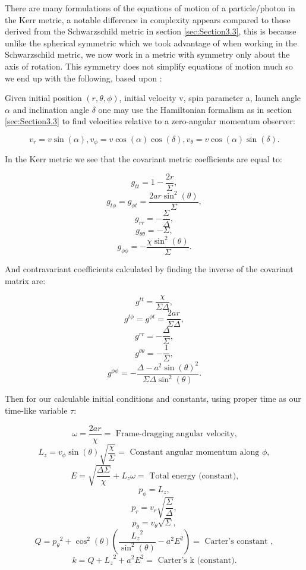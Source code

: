 \documentclass[oneside,openright,frontopenright, singlespacing]{dmathesis}
\begin{document}
	There are many formulations of the equations of motion of a particle/photon in the Kerr metric, a notable difference in complexity appears compared to those derived from the Schwarzschild metric in section \ref{sec:Section3.3}, this is because unlike the spherical symmetric which we took advantage of when working in the Schwarzschild metric, we now work in a metric with symmetry only about the axis of rotation. This symmetry does not simplify equations of motion much so we end up with the following, based upon \cite{yukterezKerr}:

\vspace{1em}
	Given initial position $(r, \theta, \phi)$, initial velocity v, spin parameter a, launch angle $\alpha$ and inclination angle $\delta$ one may use the Hamiltonian formalism as in section \ref{sec:Section3.3} to find velocities relative to a zero-angular momentum observer:
	
	\[v_r = v\sin(\alpha), v_\phi = v\cos(\alpha)\cos(\delta), v_\theta = v\cos(\alpha)\sin(\delta).\]

\vspace{1em}
	In the Kerr metric we see that the covariant metric coefficients are equal to:

	\[g_{tt} = 1-\frac{2r}{\Sigma},\]
	\[g_{t\phi} = g_{{\phi}t} = \frac{2ar\sin^2(\theta)}{\Sigma},\]
	\[g_{rr} = -\frac{\Sigma}{\Delta},\]
	\[g_{\theta\theta} = -\Sigma,\]
	\[g_{\phi\phi} = -\frac{\chi\sin^2(\theta)}{\Sigma}.\]

	And contravariant coefficients calculated by finding the inverse of the covariant matrix are:

	\[g^{tt} = \frac{\chi}{\Sigma\Delta},\]
	\[g^{t\phi} = g^{{\phi}t} = \frac{2ar}{\Sigma\Delta},\]
	\[g^{rr} = -\frac{\Delta}{\Sigma},\]
	\[g^{\theta\theta} = -\frac{1}{\Sigma},\]
	\[g^{\phi\phi} = -\frac{\Delta-a^2\sin(\theta)^2}{\Sigma\Delta\sin^2(\theta)}.\]

\vspace{1em}
	Then for our calculable initial conditions and constants, using proper time as our time-like variable $\tau$:

	\[\omega = \frac{2ar}{\chi} = \mbox{ Frame-dragging angular velocity,}\]
	\[L_{z} = v_{\phi}\sin(\theta)\sqrt{\frac{\chi}{\Sigma}} = \mbox{ Constant angular momentum along } \phi,\]
	\[E = \sqrt{\frac{\Delta\Sigma}{\chi}}+L_{z}\omega = \mbox{ Total energy (constant),}\]
	\[p_{\phi} = L_{z},\]
	\[p_{r} = v_{r}\sqrt{\frac{\Sigma}{\Delta}},\]
	\[p_{\theta} = v_{\theta}\sqrt{\Sigma},\]
	\[Q = {p_{\theta}}^2+\cos^2(\theta)\left(\frac{{L_{z}}^2}{\sin^2(\theta)}-a^2E^2\right) = \mbox{ Carter's constant },\]
	\[k = Q+{L_{z}}^2+a^2E^2 = \mbox{ Carter's k (constant).}\]
\end{document}
